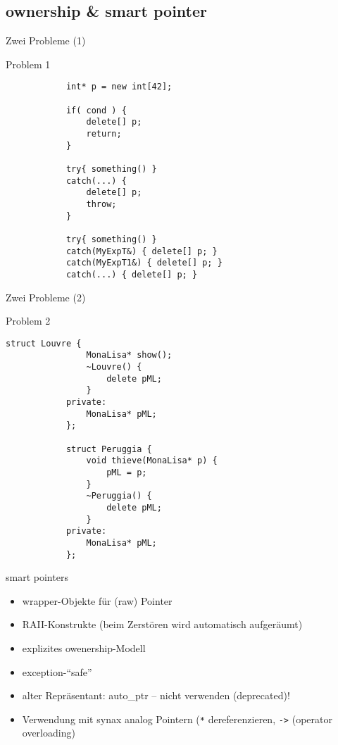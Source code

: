 \subsection{ownership \& smart pointer}

\begin{frame}[fragile]{Zwei Probleme (1)}
	\begin{block}{Problem 1}
		\begin{lstlisting}
			int* p = new int[42];
			
			if( cond ) {
			    delete[] p;
			    return;
			}
			
			try{ something() }
			catch(...) {
			    delete[] p;
			    throw;
			}
			
			try{ something() }
			catch(MyExpT&) { delete[] p; }
			catch(MyExpT1&) { delete[] p; }
			catch(...) { delete[] p; }
		\end{lstlisting}
	\end{block}
\end{frame}

\begin{frame}[fragile]{Zwei Probleme (2)}
	\begin{block}{Problem 2}
		\begin{lstlisting}[basicstyle=\scriptsize]
			struct Louvre {
			    MonaLisa* show();
			    ~Louvre() {
			        delete pML;
			    }
			private:
			    MonaLisa* pML;
			};
			
			struct Peruggia {
			    void thieve(MonaLisa* p) {
			        pML = p;
			    }
			    ~Peruggia() {
			        delete pML;
			    }
			private:
			    MonaLisa* pML;
			};
		\end{lstlisting}
	\end{block}
\end{frame}

\begin{frame}{ smart pointers }
	\begin{itemize}
		\item wrapper-Objekte für (raw) Pointer
		\item RAII-Konstrukte (beim Zerstören wird automatisch aufgeräumt)
		\item explizites owenership-Modell
		\item exception-\enquote{safe}
		\item alter Repräsentant: auto\_ptr -- nicht verwenden (deprecated)!
		\item Verwendung mit synax analog Pointern (\texttt{*} dereferenzieren, \texttt{->} (operator overloading)
	\end{itemize}
\end{frame}

